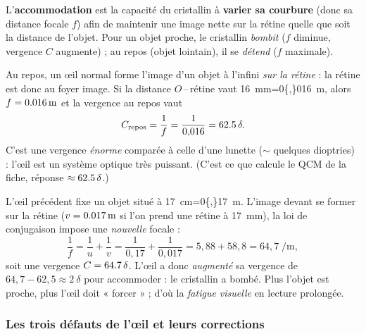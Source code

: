 \documentclass[11pt,a4paper]{article}
\begin{document}
\begin{definition}[accommodation]
L'\textbf{accommodation} est la capacité du cristallin à \textbf{varier sa courbure} (donc sa distance
focale $f$) afin de maintenir une image nette sur la rétine quelle que soit la distance de l'objet.
Pour un objet proche, le cristallin \emph{bombit} ($f$ diminue, vergence $C$ augmente) ; au repos
(objet lointain), il se \emph{détend} ($f$ maximale).
\end{definition}

\begin{exemple}
Au repos, un œil normal forme l'image d'un objet à l'infini \emph{sur la rétine} : la rétine est donc
au foyer image. Si la distance $O$\,--\,rétine vaut \SI{16}{\milli\metre}=\SI{0{,}016}{\metre}, alors
$f=\SI{0{,}016}{\metre}$ et la vergence au repos vaut
\[ C_{\text{repos}}=\frac{1}{f}=\frac{1}{0{,}016}=\SI{62{,}5}{\delta}. \]
C'est une vergence \emph{énorme} comparée à celle d'une lunette ($\sim$ quelques dioptries) :
l'œil est un système optique très puissant. (C'est ce que calcule le QCM de la fiche, réponse
$\approx \SI{62{,}5}{\delta}$.)
\end{exemple}

\begin{exemple}
L'œil précédent fixe un objet situé à \SI{17}{\centi\metre}=\SI{0{,}17}{\metre}. L'image devant se
former sur la rétine ($v=\SI{0{,}017}{\metre}$ si l'on prend une rétine à \SI{17}{\milli\metre}), la
loi de conjugaison impose une \emph{nouvelle} focale :
\[ \frac{1}{f}=\frac{1}{u}+\frac{1}{v}=\frac{1}{0{,}17}+\frac{1}{0{,}017}=5{,}88+58{,}8=64{,}7\;\si{\per\metre}, \]
soit une vergence $C=\SI{64{,}7}{\delta}$. L'œil a donc \emph{augmenté} sa vergence de
$64{,}7-62{,}5\approx \SI{2}{\delta}$ pour accommoder : le cristallin a bombé. Plus l'objet est proche,
plus l'œil doit « forcer » ; d'où la \emph{fatigue visuelle} en lecture prolongée.
\end{exemple}

\subsubsection{Les trois défauts de l'œil et leurs corrections}
\end{document}
